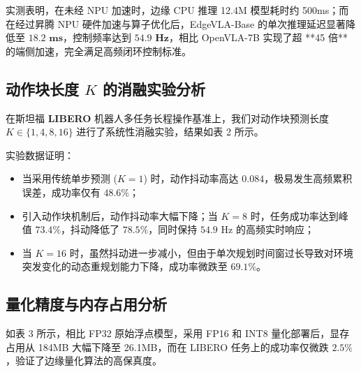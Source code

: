 \documentclass[UTF8,10pt,twocolumn]{ctexart}
\begin{document}
实测表明，在未经 NPU 加速时，边缘 CPU 推理 12.4M 模型耗时约 500ms；而在经过昇腾 NPU 硬件加速与算子优化后，EdgeVLA-Base 的单次推理延迟显著降低至 $\mathbf{18.2\text{ ms}}$，控制频率达到 $\mathbf{54.9\text{ Hz}}$，相比 OpenVLA-7B 实现了超 **45 倍** 的端侧加速，完全满足高频闭环控制标准。

\subsection{动作块长度 $K$ 的消融实验分析}
在斯坦福 \textbf{LIBERO} 机器人多任务长程操作基准上，我们对动作块预测长度 $K \in \{1, 4, 8, 16\}$ 进行了系统性消融实验，结果如表 2 所示。

\begin{table}[htbp]
\centering
\small
\caption{不同动作块长度 $K$ 在 LIBERO 基准上的成功率与轨迹抖动消融对比}
\label{tab:ablation_chunk}
\end{table}

实验数据证明：
\begin{itemize}
    \item 当采用传统单步预测 ($K=1$) 时，动作抖动率高达 $0.084$，极易发生高频累积误差，成功率仅有 $48.6\%$；
    \item 引入动作块机制后，动作抖动率大幅下降；当 $K=8$ 时，任务成功率达到峰值 $\mathbf{73.4\%}$，抖动降低了 $\mathbf{78.5\%}$，同时保持 $54.9\text{ Hz}$ 的高频实时响应；
    \item 当 $K=16$ 时，虽然抖动进一步减小，但由于单次规划时间窗过长导致对环境突发变化的动态重规划能力下降，成功率微跌至 $69.1\%$。
\end{itemize}

\subsection{量化精度与内存占用分析}
如表 3 所示，相比 FP32 原始浮点模型，采用 FP16 和 INT8 量化部署后，显存占用从 184MB 大幅下降至 26.1MB，而在 LIBERO 任务上的成功率仅微跌 $2.5\%$，验证了边缘量化算法的高保真度。
\end{document}
